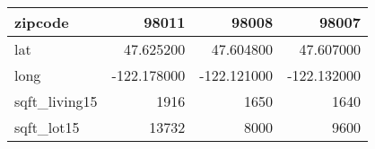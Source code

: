 \begin{table}[H]
\begin{tabular}{|l|r|r|r|}
\hline zipcode & \cellcolor[rgb]{0.9, 0.54, 0.52} 98011 & 98008 & 98007 \\
\hline lat & \cellcolor[rgb]{0.9, 0.54, 0.52} 47.625200 & 47.604800 & 47.607000 \\
\hline long & \cellcolor[rgb]{0.9, 0.54, 0.52} -122.178000 & \cellcolor[rgb]{0.9, 0.54, 0.52} -122.121000 & \cellcolor[rgb]{0.9, 0.54, 0.52} -122.132000 \\
\hline sqft\_living15 & \cellcolor[rgb]{0.9, 0.54, 0.52} 1916 & 1650 & 1640 \\
\hline sqft\_lot15 & \cellcolor[rgb]{0.9, 0.54, 0.52} 13732 & 8000 & 9600 \\
\hline
\end{tabular}
\end{table}
